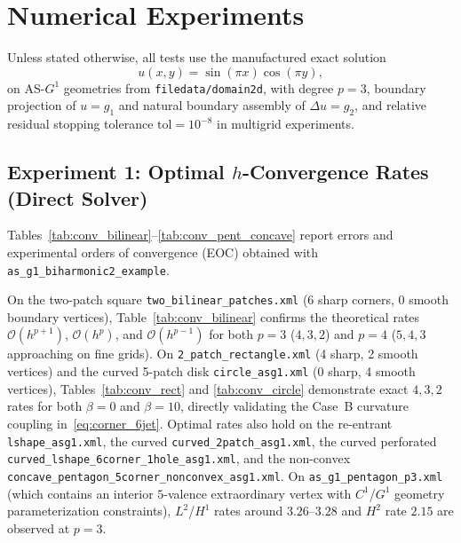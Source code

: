 \documentclass[11pt,a4paper]{article}
\begin{document}
\section{Numerical Experiments}

Unless stated otherwise, all tests use the manufactured exact solution
\[
u(x, y) = \sin(\pi x)\cos(\pi y),
\]
on AS-$G^1$ geometries from \texttt{filedata/domain2d}, with degree $p = 3$, boundary projection of $u = g_1$ and natural boundary assembly of $\Delta u = g_2$, and relative residual stopping tolerance $\mathrm{tol} = 10^{-8}$ in multigrid experiments.

\subsection{Experiment 1: Optimal $h$-Convergence Rates (Direct Solver)}
Tables~\ref{tab:conv_bilinear}--\ref{tab:conv_pent_concave} report errors and experimental orders of convergence (EOC) obtained with \texttt{as\_g1\_biharmonic2\_example}.

On the two-patch square \texttt{two\_bilinear\_patches.xml} (6 sharp corners, 0 smooth boundary vertices), Table~\ref{tab:conv_bilinear} confirms the theoretical rates $\mathcal{O}(h^{p+1})$, $\mathcal{O}(h^p)$, and $\mathcal{O}(h^{p-1})$ for both $p=3$ ($4, 3, 2$) and $p=4$ ($5, 4, 3$ approaching on fine grids). On \texttt{2\_patch\_rectangle.xml} (4 sharp, 2 smooth vertices) and the curved 5-patch disk \texttt{circle\_asg1.xml} (0 sharp, 4 smooth vertices), Tables~\ref{tab:conv_rect} and \ref{tab:conv_circle} demonstrate exact $4, 3, 2$ rates for both $\beta = 0$ and $\beta = 10$, directly validating the Case~B curvature coupling in~\eqref{eq:corner_6jet}. Optimal rates also hold on the re-entrant \texttt{lshape\_asg1.xml}, the curved \texttt{curved\_2patch\_asg1.xml}, the curved perforated \texttt{curved\_lshape\_6corner\_1hole\_asg1.xml}, and the non-convex \texttt{concave\_pentagon\_5corner\_nonconvex\_asg1.xml}. On \texttt{as\_g1\_pentagon\_p3.xml} (which contains an interior $5$-valence extraordinary vertex with $C^1$/$G^1$ geometry parameterization constraints), $L^2$/$H^1$ rates around $3.26$--$3.28$ and $H^2$ rate $2.15$ are observed at $p=3$.
\end{document}
